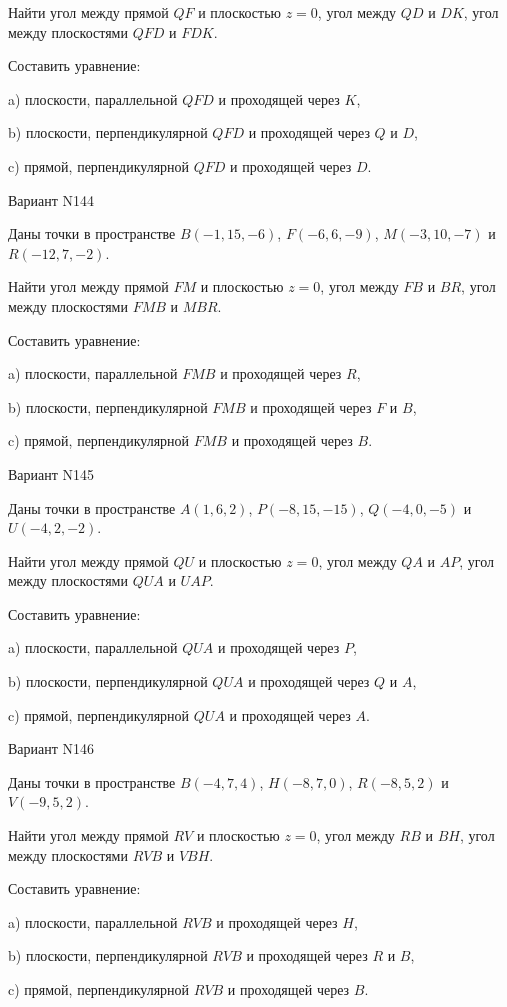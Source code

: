 \documentclass[11pt]{report}
\begin{document}
Найти угол между прямой $QF$ и плоскостью $z = 0$, угол между $QD$ и $DK$, угол между плоскостями $QFD$ 
и $FDK$.

Составить уравнение: 

a) плоскости, параллельной $QFD$ и проходящей через $K$,

b) плоскости, перпендикулярной $QFD$ и проходящей через $Q$ и $D$,

c) прямой, перпендикулярной $QFD$ и проходящей через $D$.

Вариант N144

Даны точки в пространстве
$B(-1, 15, -6)$, $F(-6, 6, -9)$, $M(-3, 10, -7)$ и
$R(-12, 7, -2)$.

Найти угол между прямой $FM$ и плоскостью $z = 0$, угол между $FB$ и $BR$, угол между плоскостями $FMB$ 
и $MBR$.

Составить уравнение: 

a) плоскости, параллельной $FMB$ и проходящей через $R$,

b) плоскости, перпендикулярной $FMB$ и проходящей через $F$ и $B$,

c) прямой, перпендикулярной $FMB$ и проходящей через $B$.

Вариант N145

Даны точки в пространстве
$A(1, 6, 2)$, $P(-8, 15, -15)$, $Q(-4, 0, -5)$ и
$U(-4, 2, -2)$.

Найти угол между прямой $QU$ и плоскостью $z = 0$, угол между $QA$ и $AP$, угол между плоскостями $QUA$ 
и $UAP$.

Составить уравнение: 

a) плоскости, параллельной $QUA$ и проходящей через $P$,

b) плоскости, перпендикулярной $QUA$ и проходящей через $Q$ и $A$,

c) прямой, перпендикулярной $QUA$ и проходящей через $A$.

Вариант N146

Даны точки в пространстве
$B(-4, 7, 4)$, $H(-8, 7, 0)$, $R(-8, 5, 2)$ и
$V(-9, 5, 2)$.

Найти угол между прямой $RV$ и плоскостью $z = 0$, угол между $RB$ и $BH$, угол между плоскостями $RVB$ 
и $VBH$.

Составить уравнение: 

a) плоскости, параллельной $RVB$ и проходящей через $H$,

b) плоскости, перпендикулярной $RVB$ и проходящей через $R$ и $B$,

c) прямой, перпендикулярной $RVB$ и проходящей через $B$.
\end{document}
